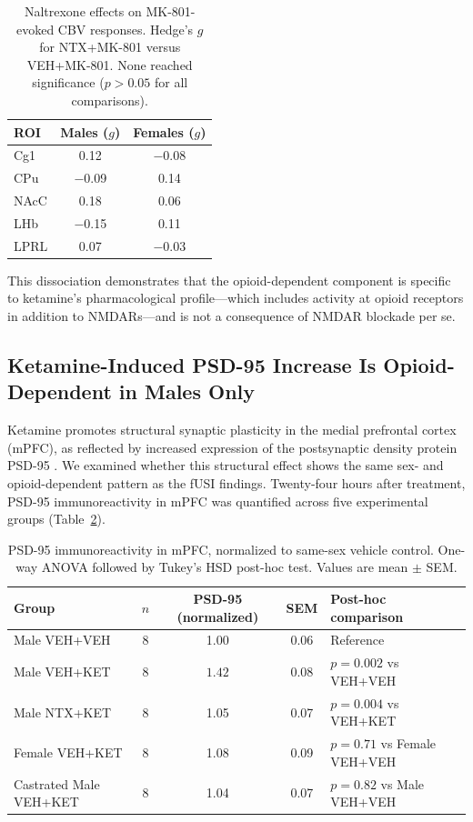 \documentclass[11pt]{article}
\begin{document}
\begin{table}[H]
\centering
\caption{Naltrexone effects on MK-801-evoked CBV responses. Hedge's $g$ for NTX+MK-801 versus VEH+MK-801. None reached significance ($p > 0.05$ for all comparisons).}
\label{tab:mk801}
\begin{tabular}{lcc}
\toprule
ROI & Males ($g$) & Females ($g$) \\
\midrule
Cg1 & 0.12 & $-$0.08 \\
CPu & $-$0.09 & 0.14 \\
NAcC & 0.18 & 0.06 \\
LHb & $-$0.15 & 0.11 \\
LPRL & 0.07 & $-$0.03 \\
\bottomrule
\end{tabular}
\end{table}

This dissociation demonstrates that the opioid-dependent component is specific to ketamine's pharmacological profile---which includes activity at opioid receptors in addition to NMDARs---and is not a consequence of NMDAR blockade per se.

\subsection{Ketamine-Induced PSD-95 Increase Is Opioid-Dependent in Males Only}

Ketamine promotes structural synaptic plasticity in the medial prefrontal cortex (mPFC), as reflected by increased expression of the postsynaptic density protein PSD-95 \citep{li2010nmda, duman2016synaptic}. We examined whether this structural effect shows the same sex- and opioid-dependent pattern as the fUSI findings. Twenty-four hours after treatment, PSD-95 immunoreactivity in mPFC was quantified across five experimental groups (Table~\ref{tab:psd95}).

\begin{table}[H]
\centering
\caption{PSD-95 immunoreactivity in mPFC, normalized to same-sex vehicle control. One-way ANOVA followed by Tukey's HSD post-hoc test. Values are mean $\pm$ SEM.}
\label{tab:psd95}
\begin{tabular}{lcccl}
\toprule
Group & $n$ & PSD-95 (normalized) & SEM & Post-hoc comparison \\
\midrule
Male VEH+VEH & 8 & 1.00 & 0.06 & Reference \\
Male VEH+KET & 8 & $\mathbf{1.42}$ & 0.08 & $p = 0.002$ vs VEH+VEH \\
Male NTX+KET & 8 & 1.05 & 0.07 & $p = 0.004$ vs VEH+KET \\
Female VEH+KET & 8 & 1.08 & 0.09 & $p = 0.71$ vs Female VEH+VEH \\
Castrated Male VEH+KET & 8 & 1.04 & 0.07 & $p = 0.82$ vs Male VEH+VEH \\
\bottomrule
\end{tabular}
\end{table}
\end{document}
